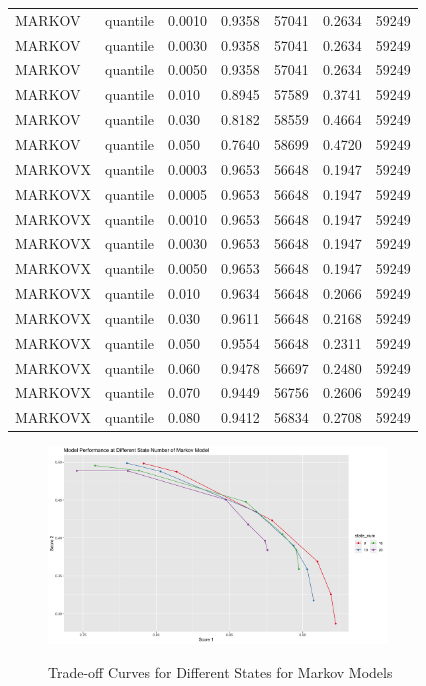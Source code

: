 \documentclass{article}
\begin{document}
\begin{longtable}[htbp]{l|l|l|*{4}{c}}
    MARKOV & quantile & 0.0010 & 0.9358 & 57041 & 0.2634 & 59249\\
    MARKOV & quantile & 0.0030 & 0.9358 & 57041 & 0.2634 & 59249\\
    MARKOV & quantile & 0.0050 & 0.9358 & 57041 & 0.2634 & 59249\\
    MARKOV & quantile & 0.010 & 0.8945 & 57589 & 0.3741 & 59249\\
    MARKOV & quantile & 0.030 & 0.8182 & 58559 & 0.4664 & 59249\\
    MARKOV & quantile & 0.050 & 0.7640 & 58699 & 0.4720 & 59249\\
    MARKOVX & quantile & 0.0003 & 0.9653 & 56648 & 0.1947 & 59249\\
    MARKOVX & quantile & 0.0005 & 0.9653 & 56648 & 0.1947 & 59249\\
    MARKOVX & quantile & 0.0010 & 0.9653 & 56648 & 0.1947 & 59249\\
    MARKOVX & quantile & 0.0030 & 0.9653 & 56648 & 0.1947 & 59249\\
    MARKOVX & quantile & 0.0050 & 0.9653 & 56648 & 0.1947 & 59249\\
    MARKOVX & quantile & 0.010 & 0.9634 & 56648 & 0.2066 & 59249\\
    MARKOVX & quantile & 0.030 & 0.9611 & 56648 & 0.2168 & 59249\\
    MARKOVX & quantile & 0.050 & 0.9554 & 56648 & 0.2311 & 59249\\
    MARKOVX & quantile & 0.060 & 0.9478 & 56697 & 0.2480 & 59249\\
    MARKOVX & quantile & 0.070 & 0.9449 & 56756 & 0.2606 & 59249\\
    MARKOVX & quantile & 0.080 & 0.9412 & 56834 & 0.2708 & 59249\\
\end{longtable}

\begin{figure}[htbp]
    \caption{Trade-off Curves for Different States for Markov Models}
    \centering
    \includegraphics[width = 0.8\textwidth]{images/ModelPerformanceatDifferentStateNumberofMarkovModel.png}
    \label{fig:fig1.3.5}
\end{figure}
\end{document}

